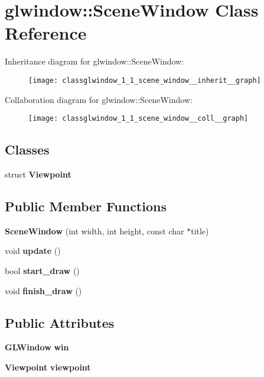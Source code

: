 \section{glwindow\+:\+:Scene\+Window Class Reference}
\label{classglwindow_1_1_scene_window}


Inheritance diagram for glwindow\+:\+:Scene\+Window\+:\nopagebreak
\begin{figure}[H]
\begin{center}
\leavevmode
\texttt{[image: classglwindow\_1\_1\_scene\_window\_\_inherit\_\_graph]}
\end{center}
\end{figure}


Collaboration diagram for glwindow\+:\+:Scene\+Window\+:\nopagebreak
\begin{figure}[H]
\begin{center}
\leavevmode
\texttt{[image: classglwindow\_1\_1\_scene\_window\_\_coll\_\_graph]}
\end{center}
\end{figure}
\subsection*{Classes}
\begin{DoxyCompactItemize}
\item 
struct \textbf{ Viewpoint}
\end{DoxyCompactItemize}
\subsection*{Public Member Functions}
\begin{DoxyCompactItemize}
\item 
\mbox{\label{classglwindow_1_1_scene_window_a41959b518db30a3ab785492f1ac010fd}} 
{\bfseries Scene\+Window} (int width, int height, const char $\ast$title)
\item 
\mbox{\label{classglwindow_1_1_scene_window_a2e960ccafe493ce9e71418a03bf88301}} 
void {\bfseries update} ()
\item 
\mbox{\label{classglwindow_1_1_scene_window_af3c36c90d57620298fd2796ced9af848}} 
bool {\bfseries start\+\_\+draw} ()
\item 
\mbox{\label{classglwindow_1_1_scene_window_ab0688f7612cdaa8b06b86a3979abcdf4}} 
void {\bfseries finish\+\_\+draw} ()
\end{DoxyCompactItemize}
\subsection*{Public Attributes}
\begin{DoxyCompactItemize}
\item 
\mbox{\label{classglwindow_1_1_scene_window_a0946d9bab275dab533fe778af5d3ec7a}} 
\textbf{ G\+L\+Window} {\bfseries win}
\item 
\mbox{\label{classglwindow_1_1_scene_window_aac5dd0d07cb2dd42aa044622c6d7de6b}} 
\textbf{ Viewpoint} {\bfseries viewpoint}
\end{DoxyCompactItemize}
